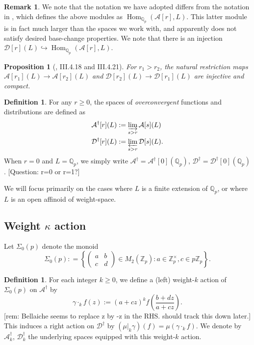 \documentclass[10pt]{amsart}
\theoremstyle{plain}
\newtheorem{proposition}[theorem]{Proposition}
\theoremstyle{definition}
\newtheorem{definition}[theorem]{Definition}
\newtheorem{remark}[theorem]{Remark}
\newcommand{\ZZ}{{\mathbb{Z}}}
\newcommand{\QQ}{{\mathbb{Q}}}
\newcommand{\cA}{\mathcal{A}}
\newcommand{\cD}{\mathcal{D}}
\DeclareMathOperator{\Hom}{Hom}
\begin{document}
\begin{remark}
We note that the notation we have adopted differs from the notation in \cite{HarronPollack}, which defines the above modules as $\Hom_{\QQ_p}(\cA[r],L)$. This latter module is in fact much larger than the spaces we work with, and apparently does not satisfy desired base-change properties. We note that there is an injection $\cD[r](L)\hookrightarrow \Hom_{\QQ_p} (\cA[r], L)$.
\end{remark}

\begin{proposition}[\cite{Bellaiche}, III.4.18 and III.4.21] For $r_1> r_2$, the natural restriction maps $\cA[r_1](L)\rightarrow \cA[r_2](L)$  and $\cD[r_2](L)\rightarrow \cD[r_1](L)$ are injective and compact.
\end{proposition}

\begin{definition}
For any $r\geq 0$, the spaces of \emph{overconvergent} functions and distributions are defined as
\begin{align}
	\cA^\dagger[r](L) &:= \varinjlim_{s>r} \cA[s](L)\\
	\cD^\dagger[r](L) &:=\varprojlim_{s>r} \cD[s](L).
\end{align}
When $r=0$ and $L=\QQ_p$, we simply write $\cA^\dagger = \cA^\dagger[0](\QQ_p)$, $\cD^\dagger = \cD^\dagger[0](\QQ_p)$.
[Question: r=0 or r=1?]
\end{definition}
We will focus primarily on the cases where $L$ is a finite extension of $\QQ_p$, or where $L$ is an open affinoid of weight-space.

\subsection{Weight $\kappa$ action}
Let $\Sigma_0(p)$ denote the monoid
\begin{equation*}
	\Sigma_0(p) : = \left\{ \begin{pmatrix} a & b \\ c & d\end{pmatrix}\in M_2(\ZZ_p) : a\in \ZZ_p^\times, c\in p\ZZ_p\right\}.
\end{equation*}

\begin{definition}
For each integer $k\geq 0$, we define a (left) weight-$k$ action of $\Sigma_0(p)$ on $\cA^\dagger$ by 
\begin{equation}
	\gamma \cdot_k f(z) := (a+cz)^k f\left(\frac{b+dz}{a+cz}\right).
\end{equation}
[rem: Bellaiche seems to replace z by -z in the RHS. should track this down later.]
This induces a right action on $\cD^\dagger$ by $(\mu|_k\gamma) (f) = \mu(\gamma\cdot_k f)$. We denote by $\cA_k^\dagger$, $\cD_k^\dagger$ the underlying spaces equipped with this weight-$k$ action.
\end{definition}
\end{document}
